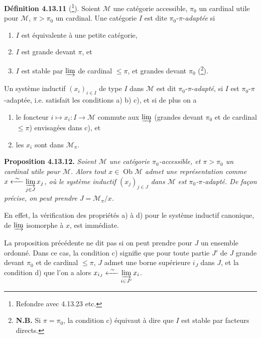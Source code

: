\documentclass[11pt]{article}
\newcommand{\printedpage}[1]{\marginpar{\footnotesize p.~#1}}
\newcommand{\msp}[1]{\marginpar{\footnotesize [#1]}}
\newcommand{\ilim}{\varinjlim\limits}
\newcommand{\Ob}{\operatorname{Ob}}
\begin{document}
\printedpage{114}

\msp{page 303}\noindent\textbf{Définition 4.13.11} (\footnote[132]{Refondre avec 4.13.23 etc.}). Soient $\mathcal{M}$ une catégorie accessible, $\pi_0$ un cardinal utile pour $\mathcal{M}$, $\pi > \pi_0$ un cardinal. Une catégorie $I$ est dite $\pi_0$-$\pi$-\textit{adaptée} si
\begin{enumerate}
\item[a)] $I$ est équivalente à une petite catégorie,
\item[b)] $I$ est grande devant $\pi$, et
\item[c)] $I$ est stable par $\varinjlim$ de cardinal $\leqslant \pi$, et grandes devant $\pi_0$ (\footnote[133]{\textbf{N.B.} Si $\pi = \pi_0$, la condition c) équivaut à dire que $I$ est stable par facteurs directs.}).
\end{enumerate}
\noindent Un système inductif $(x_i)_{i\in I}$ de type $I$ dans $\mathcal{M}$ est dit $\pi_0$-$\pi$-\textit{adapté}, si $I$ est $\pi_0$-$\pi$-adaptée, i.e. satisfait les conditions a) b) c), et si de plus on a
\begin{enumerate}
\item[d)] le foncteur $i \longmapsto x_i : I \longrightarrow \mathcal{M}$ commute aux $\varinjlim$ (grandes devant $\pi_0$ et de cardinal $\leqslant \pi$) envisagées dans c), et
\item[e)] les $x_i$ sont dans $\mathcal{M}_\pi$.
\end{enumerate}

\noindent\textbf{Proposition 4.13.12.} \textit{Soient $\mathcal{M}$ une catégorie $\pi_0$-accessible, et $\pi > \pi_0$ un cardinal utile pour $\mathcal{M}$. Alors tout $x \in \Ob\mathcal{M}$ admet une représentation comme $x \xleftarrow{\ \sim\ } \ilim_{j\in J} x_j$, où le système inductif $(x_j)_{j\in J}$ dans $\mathcal{M}$ est $\pi_0$-$\pi$-adapté. De façon précise, on peut prendre $J = \mathcal{M}_\pi/x$.}

\msp{page 304}\noindent En effet, la vérification des propriétés a) à d) pour le système inductif canonique, de $\varinjlim$ isomorphe à $x$, est immédiate.

La proposition précédente ne dit pas si on peut prendre pour $J$ un ensemble ordonné. Dans ce cas, la condition c) signifie que pour toute partie $J'$ de $J$ grande devant $\pi_0$ et de cardinal $\leqslant \pi$, $J$ admet une borne supérieure $i_J$ dans $J$, et la condition d) que l'on a alors $x_{i_J} \xleftarrow{\ \sim\ } \ilim_{i\in J'} x_i$.
\end{document}
